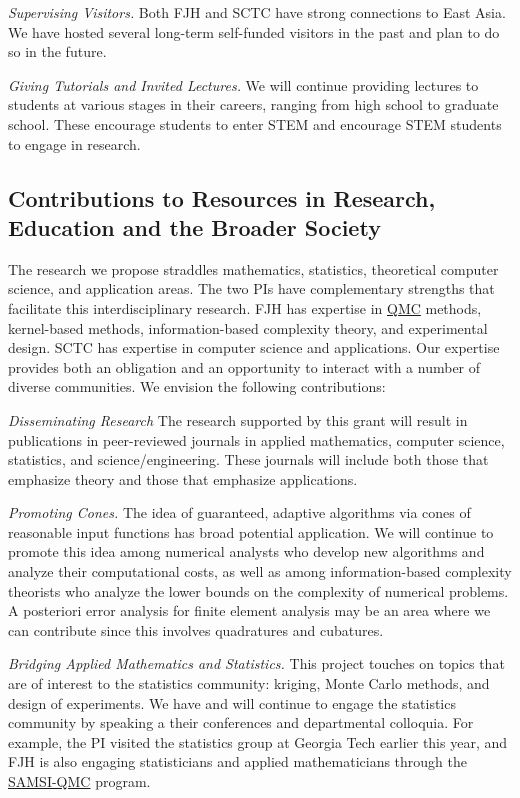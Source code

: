 \documentclass[11pt]{NSFamsart}
\newcommand{\QMC}{\hyperlink{QMClink}{QMC}\xspace}
\newcommand{\SAMSIQMC}{\hyperlink{SAMSIlink}{SAMSI-QMC}\xspace}
\begin{document}
\emph{Supervising Visitors.}
Both FJH and SCTC have strong connections to East Asia.  We have hosted several long-term 
self-funded visitors in the past and plan to do so in the future.

\emph{Giving Tutorials and Invited Lectures.}
We will continue providing lectures to students at various stages in their careers, ranging from high 
school to graduate school. These encourage students to enter STEM and encourage STEM students 
to engage in research.


\subsection{Contributions to Resources in Research, Education and the Broader Society} 
\label{BroaderTwoSec}

The research we propose straddles mathematics, statistics, theoretical computer science, and 
application 
areas.  The two PIs have complementary strengths that facilitate this interdisciplinary research.  FJH 
has expertise in \QMC methods, kernel-based methods, information-based complexity 
theory, and experimental design. SCTC has expertise in computer science and applications.  Our 
expertise provides both an obligation and an opportunity to interact with a number of diverse 
communities. We envision the following contributions:

\emph{Disseminating Research}
The research supported by this grant will result in publications in peer-reviewed journals in applied 
mathematics, computer science, statistics, and science/engineering. These 
journals will include both those that emphasize theory and those that emphasize applications.

\emph{Promoting Cones.} The idea of guaranteed, adaptive algorithms via cones of reasonable input 
functions 
has broad potential application.  We will continue to promote this idea among numerical analysts 
who 
develop new algorithms and analyze their computational costs, as well as among information-based 
complexity theorists who analyze the lower bounds on the complexity of numerical problems.  A 
posteriori error analysis for finite element analysis may be an area where we can contribute since 
this involves quadratures and cubatures.

\emph{Bridging Applied Mathematics and Statistics.}
This project touches on topics that are of interest to the statistics community: kriging, Monte Carlo 
methods, and design of experiments.  We have and will continue to engage the statistics community 
by speaking a their conferences and departmental colloquia.  For example, the PI visited the 
statistics group at Georgia Tech earlier this year, and FJH is also engaging statisticians and 
applied mathematicians through the \SAMSIQMC program.
\end{document}
